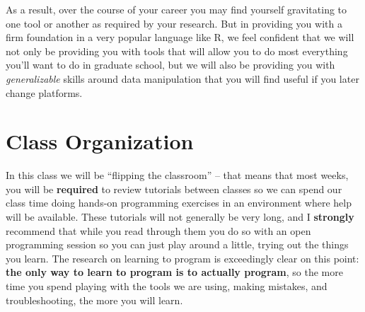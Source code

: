 \documentclass[12pt]{article}
\begin{document}
As a result, over the course of your career you may find yourself gravitating to one tool or another as required by your research. But in providing you with a firm foundation in a very popular language like R, we feel confident that we will not only be providing you with tools that will allow you to do most everything you'll want to do in graduate school, but we will also be providing you with \emph{generalizable} skills around data manipulation that you will find useful if you later change platforms.

\section{Class Organization}

In this class we will be ``flipping the classroom'' -- that means that most weeks, you will be \textbf{required} to review tutorials between classes so we can spend our class time doing hands-on programming exercises in an environment where help will be available. These tutorials will not generally be very long, and I \textbf{strongly} recommend that while you read through them you do so with an open programming session so you can just play around a little, trying out the things you learn. The research on learning to program is exceedingly clear on this point: \textbf{the only way to learn to program is to actually program}, so the more time you spend playing with the tools we are using, making mistakes, and troubleshooting, the more you will learn.


\end{document}
